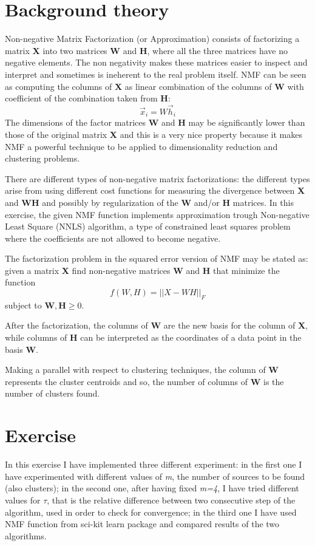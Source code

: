 \documentclass[a4paper,10pt]{report}
\begin{document}
\chapter{Background theory}\label{chap:background}
Non-negative Matrix Factorization (or Approximation) consists of factorizing a matrix \textbf{X} into two matrices \textbf{W} and \textbf{H}, where all the three matrices have no negative elements.
The non negativity makes these matrices easier to inspect and interpret and sometimes is ineherent to the real problem itself.
NMF can be seen as computing the columns of \textbf{X} as linear combination of the columns of \textbf{W} with coefficient of the combination taken from \textbf{H}:
\begin{equation}
    \vec{x}_i = W\vec{h}_i
\end{equation}
The dimensions of the factor matrices \textbf{W} and \textbf{H} may be significantly lower than those of the original matrix \textbf{X} and this is a very nice property because it makes NMF a powerful technique to be applied to dimensionality reduction and clustering problems.

There are different types of non-negative matrix factorizations:
the different types arise from using different cost functions for measuring the divergence between \textbf{X} and \textbf{WH} and possibly by regularization of the \textbf{W} and/or \textbf{H} matrices.
In this exercise, the given NMF function implements approximation trough Non-negative Least Square (NNLS) algorithm, a type of constrained least squares problem where the coefficients are not allowed to become negative.

The factorization problem in the squared error version of NMF may be stated as: given a matrix \textbf{X} find non-negative matrices \textbf{W} and \textbf{H} that minimize the function
\begin{equation}
    f(W,H) = ||X-WH||_F
\end{equation}
subject to $\textbf{W},\textbf{H} \geq 0$.

After the factorization, the columns of \textbf{W} are the new basis for the column of \textbf{X}, while columns of \textbf{H} can be interpreted as the coordinates of a data point in the basis \textbf{W}.

Making a parallel with respect to clustering techniques, the column of \textbf{W} represents the cluster centroids and so, the number of columns of \textbf{W} is the number of clusters found.

\chapter{Exercise}\label{chap:experiment}
In this exercise I have implemented three different experiment: in the first one I have experimented with different values of \emph{m}, the number of sources to be found (also clusters); 
in the second one, after having fixed \emph{m=4}, I have tried different values for $\tau$, that is the relative difference between two consecutive step of the algorithm, used in order to check for convergence;
in the third one I have used NMF function from sci-kit learn package and compared results of the two algorithms.
\end{document}
